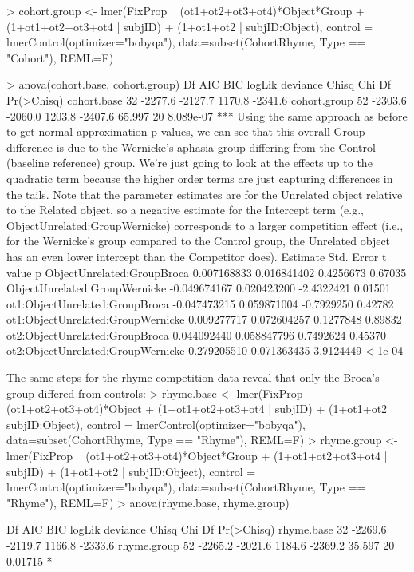 > cohort.group <- lmer(FixProp ~ (ot1+ot2+ot3+ot4)*Object*Group + (1+ot1+ot2+ot3+ot4 | subjID) + (1+ot1+ot2 | subjID:Object), control = lmerControl(optimizer="bobyqa"), data=subset(CohortRhyme, Type == "Cohort"), REML=F)

> anova(cohort.base, cohort.group)
             Df     AIC     BIC logLik deviance  Chisq Chi Df Pr(>Chisq)    
cohort.base  32 -2277.6 -2127.7 1170.8  -2341.6                             
cohort.group 52 -2303.6 -2060.0 1203.8  -2407.6 65.997     20  8.089e-07 ***
Using the same approach as before to get normal-approximation p-values, we can see that this overall Group difference is due to the Wernicke's aphasia group differing from the Control (baseline reference) group. We're just going to look at the effects up to the quadratic term because the higher order terms are just capturing differences in the tails. Note that the parameter estimates are for the Unrelated object relative to the Related object, so a negative estimate for the Intercept term (e.g., ObjectUnrelated:GroupWernicke) corresponds to a larger competition effect (i.e., for the Wernicke's group compared to the Control group, the Unrelated object has an even lower intercept than the Competitor does).
                                      Estimate  Std. Error     t value       p
ObjectUnrelated:GroupBroca         0.007168833 0.016841402   0.4256673 0.67035
ObjectUnrelated:GroupWernicke     -0.049674167 0.020423200  -2.4322421 0.01501
ot1:ObjectUnrelated:GroupBroca    -0.047473215 0.059871004  -0.7929250 0.42782
ot1:ObjectUnrelated:GroupWernicke  0.009277717 0.072604257   0.1277848 0.89832
ot2:ObjectUnrelated:GroupBroca     0.044092440 0.058847796   0.7492624 0.45370
ot2:ObjectUnrelated:GroupWernicke  0.279205510 0.071363435   3.9124449 < 1e-04

The same steps for the rhyme competition data reveal that only the Broca's group differed from controls:
> rhyme.base <- lmer(FixProp ~ (ot1+ot2+ot3+ot4)*Object + (1+ot1+ot2+ot3+ot4 | subjID) + (1+ot1+ot2 | subjID:Object), control = lmerControl(optimizer="bobyqa"), data=subset(CohortRhyme, Type == "Rhyme"), REML=F)
> rhyme.group <- lmer(FixProp ~ (ot1+ot2+ot3+ot4)*Object*Group + (1+ot1+ot2+ot3+ot4 | subjID) + (1+ot1+ot2 | subjID:Object), control = lmerControl(optimizer="bobyqa"), data=subset(CohortRhyme, Type == "Rhyme"), REML=F)
> anova(rhyme.base, rhyme.group)

            Df     AIC     BIC logLik deviance  Chisq Chi Df Pr(>Chisq)  
rhyme.base  32 -2269.6 -2119.7 1166.8  -2333.6                           
rhyme.group 52 -2265.2 -2021.6 1184.6  -2369.2 35.597     20    0.01715 *

